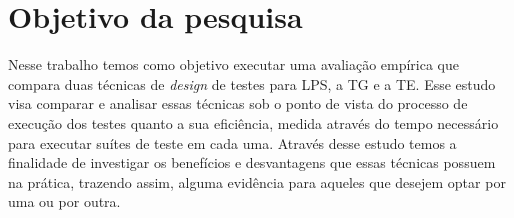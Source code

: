 \section{Objetivo da pesquisa}
\label{sec:objetivos}
Nesse trabalho temos como objetivo executar uma avaliação empírica que compara
duas técnicas de \emph{design} de testes para LPS, a TG e a TE. Esse estudo visa
comparar e analisar essas técnicas sob o ponto de vista do processo de execução
dos testes quanto a sua eficiência, medida através do tempo necessário para
executar suítes de teste em cada uma. Através desse estudo temos a finalidade de
investigar os benefícios e desvantagens que essas técnicas possuem na prática,
trazendo assim, alguma evidência para aqueles que desejem optar por uma ou por
outra.
